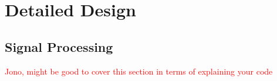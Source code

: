 \documentclass[main.tex]{subfiles}
\begin{document}
\chapter{Detailed Design}
\section{Signal Processing}
\textcolor{red}{Jono, might be good to cover this section in terms of explaining your code}
\end{document}
